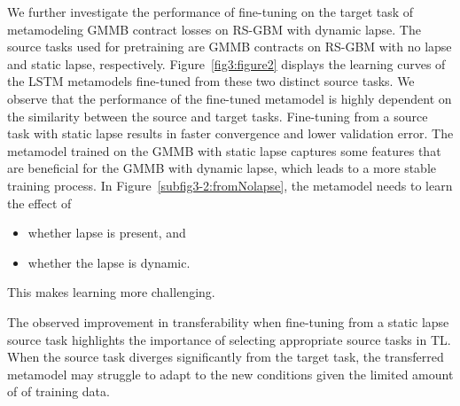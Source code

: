 We further investigate the performance of fine-tuning on the target task of metamodeling GMMB contract losses on RS-GBM with dynamic lapse. 
The source tasks used for pretraining are GMMB contracts on RS-GBM with no lapse and static lapse, respectively. 
Figure~\ref{fig3:figure2} displays the learning curves of the LSTM metamodels fine-tuned from these two distinct source tasks.
We observe that the performance of the fine-tuned metamodel is highly dependent on the similarity between the source and target tasks.
Fine-tuning from a source task with static lapse results in faster convergence and lower validation error.
The metamodel trained on the GMMB with static lapse captures some features that are beneficial for the GMMB with dynamic lapse, which leads to a more stable training process.
In Figure~\ref{subfig3-2:fromNolapse}, the metamodel needs to learn the effect of 
\begin{itemize}
    \item whether lapse is present, and
    \item whether the lapse is dynamic.
\end{itemize}
This makes learning more challenging.

The observed improvement in transferability when fine-tuning from a static lapse source task highlights the importance of selecting appropriate source tasks in TL. 
When the source task diverges significantly from the target task, the transferred metamodel may struggle to adapt to the new conditions given the limited amount of of training data.

